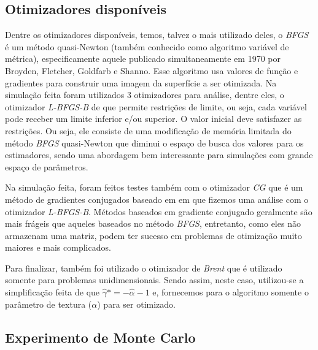 \documentclass[12pt]{article}
\begin{document}
\subsection{Otimizadores disponíveis}

Dentre os otimizadores disponíveis, temos, talvez o mais utilizado deles, o \emph{BFGS} é um método quasi-Newton (também conhecido como algoritmo variável de métrica), especificamente aquele publicado simultaneamente em 1970 por Broyden, Fletcher, Goldfarb e Shanno. Esse algoritmo usa valores de função e gradientes para construir uma imagem da superfície a ser otimizada. Na simulação feita foram utilizados 3 otimizadores para análise, dentre eles, o otimizador \emph{L-BFGS-B} de \citet{Byrd_1995} que permite restrições de limite, ou seja, cada variável pode receber um limite inferior e/ou superior. O valor inicial deve satisfazer as restrições. Ou seja, ele consiste de uma modificação de memória limitada do método \emph{BFGS} quasi-Newton que diminui o espaço de busca dos valores para os estimadores, sendo uma abordagem bem interessante para simulações com grande espaço de parâmetros.

Na simulação feita, foram feitos testes também com o otimizador \emph{CG} que é um método de gradientes conjugados baseado em \citet{Fletcher64} em que fizemos uma análise com o otimizador \emph{L-BFGS-B}. Métodos baseados em gradiente conjugado geralmente são mais frágeis que aqueles baseados no método \emph{BFGS}, entretanto, como eles não armazenam uma matriz, podem ter sucesso em problemas de otimização muito maiores e mais complicados.

Para finalizar, também foi utilizado o otimizador de \emph{Brent} que é utilizado somente para problemas unidimensionais. Sendo assim, neste caso, utilizou-se a simplificação feita de que $\widehat{\gamma}* = -\widehat{\alpha} - 1$ e, fornecemos para o algoritmo somente o parâmetro de textura ($\alpha$) para ser otimizado.

\subsection{Experimento de Monte Carlo}
\end{document}
